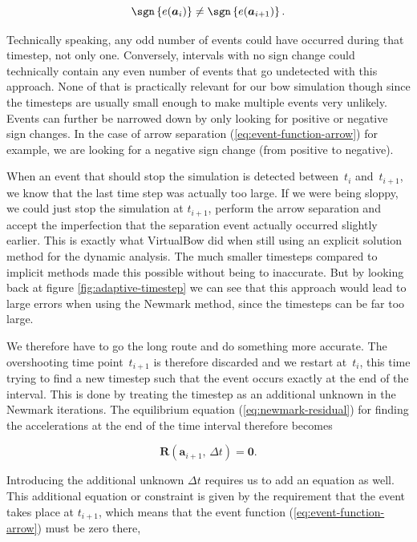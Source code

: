 \begin{equation}
\sgn\left\{ e(\boldsymbol{a}_{i}) \right\} \neq \sgn\left\{ e(\boldsymbol{a}_{i+1}) \right\}.
\end{equation}

Technically speaking, any odd number of events could have occurred during that timestep, not only one.
Conversely, intervals with no sign change could technically contain any even number of events that go undetected with this approach.
None of that is practically relevant for our bow simulation though since the timesteps are usually small enough to make multiple events very unlikely.
Events can further be narrowed down by only looking for positive or negative sign changes.
In the case of arrow separation (\ref{eq:event-function-arrow}) for example, we are looking for a negative sign change (from positive to negative).

When an event that should stop the simulation is detected between~$t_{i}$ and~$t_{i+1}$, we know that the last time step was actually too large.
If we were being sloppy, we could just stop the simulation at $t_{i+1}$, perform the arrow separation and accept the imperfection that the separation event actually occurred slightly earlier.
This is exactly what VirtualBow did when still using an explicit solution method for the dynamic analysis.
The much smaller timesteps compared to implicit methods made this possible without being to inaccurate.
But by looking back at figure \ref{fig:adaptive-timestep} we can see that this approach would lead to large errors when using the Newmark method, since the timesteps can be far too large.

We therefore have to go the long route and do something more accurate.
The overshooting time point~$t_{i+1}$ is therefore discarded and we restart at~$t_{i}$, this time trying to find a new timestep such that the event occurs exactly at the end of the interval.
This is done by treating the timestep as an additional unknown in the Newmark iterations.
The equilibrium equation (\ref{eq:newmark-residual}) for finding the accelerations at the end of the time interval therefore becomes

\begin{equation}
\boldsymbol{R}(\boldsymbol{a}_{i+1},\,\Delta t) = \boldsymbol{0}. \label{eq:event-location-equation}
\end{equation}

Introducing the additional unknown $\Delta t$ requires us to add an equation as well.
This additional equation or constraint is given by the requirement that the event takes place at $t_{i+1}$, which means that the event function (\ref{eq:event-function-arrow}) must be zero there,

